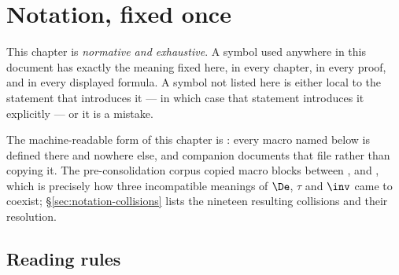 
\section{Notation, fixed once}\label{sec:notation}

This chapter is \emph{normative and exhaustive}. A symbol used anywhere in this
document has exactly the meaning fixed here, in every chapter, in every proof, and
in every displayed formula. A symbol not listed here is either local to the
statement that introduces it --- in which case that statement introduces it
explicitly --- or it is a mistake.

The machine-readable form of this chapter is : every macro
named below is defined there and nowhere else, and companion documents
 that file rather than copying it. The pre-consolidation
corpus copied macro blocks between ,
 and , which is precisely how
three incompatible meanings of $\De$, $\tau$ and $\inv$ came to coexist; \S\ref{sec:notation-collisions}
lists the nineteen resulting collisions and their resolution.

\subsection{Reading rules}\label{sec:notation-rules}

